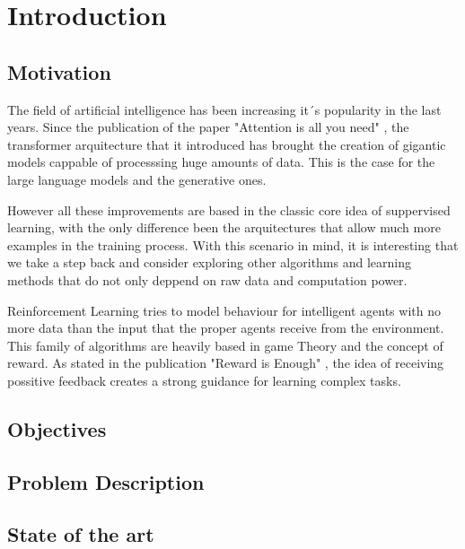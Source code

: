 \chapter{Introduction}



\section{Motivation}

The field of artificial intelligence has been increasing it´s popularity in the last years. Since the publication of the paper "Attention is all you need" \cite{attention}, the transformer arquitecture that it introduced has brought the creation of gigantic models cappable of processsing huge amounts of data. This is the case for the large language models and the generative ones.

However all these improvements are based in the classic core idea of suppervised learning, with the only difference been the arquitectures that allow much more examples in the training process. With this scenario in mind, it is interesting that we take a step back and consider exploring other algorithms and learning methods that do not only deppend on raw data and computation power.

Reinforcement Learning tries to model behaviour for intelligent agents with no more data than the input that the proper agents receive from the environment. This family of algorithms are heavily based in game Theory and the concept of reward. As stated in the publication "Reward is Enough"  \cite{rewardIsEnough}, the idea of receiving possitive feedback creates a strong guidance for learning complex tasks.

\section{Objectives}

\section{Problem Description}

\section{State of the art}


